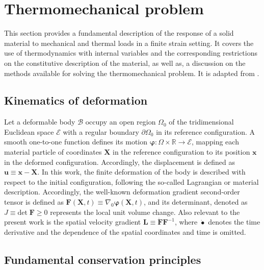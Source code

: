\chapter{Thermomechanical problem} \label{ch:thermomechanical_problem}

This section provides a fundamental description of the response of a solid material to mechanical and thermal loads in a finite strain setting.
It covers the use of thermodynamics with internal variables and the corresponding restrictions on the constitutive description of the material, as well as, a discussion on the methods available for solving the thermomechanical problem.
It is adapted from \cite{vila-chaNumericalAssessmentPartitioned2023a}.

\section{Kinematics of deformation}

Let a deformable body $\mathscr{B}$ occupy an open region $\Omega_0$ of the tridimensional Euclidean space $\mathscr{E}$ with a regular boundary $\partial \Omega_0$ in its reference configuration.
A smooth one-to-one function defines its motion \(\bm{\varphi}\colon \Omega\times \mathbb{R}\to \mathscr{E}\), mapping each material particle of coordinates $\bm{X}$ in the reference configuration to its position $\bm{x}$ in the deformed configuration.
Accordingly, the displacement is defined as \(\bm{u}\equiv \bm{x} - \bm{X}\).
In this work, the finite deformation of the body is described with respect to the initial configuration, following the so-called Lagrangian or material description.
Accordingly, the well-known deformation gradient second-order tensor is defined as \(\bm{F}(\bm{X},t)\equiv \nabla_0\bm\varphi(\bm{X},t)\), and its determinant, denoted as \(J\equiv \text{det}\;\bm{F} \geq 0\) represents the local unit volume change.
Also relevant to the present work is the spatial velocity gradient $\bm L\equiv \dot{\bm F}{\bm F}^{-1}$, where $\dot\bullet$ denotes the time derivative and the dependence of the spatial coordinates and time is omitted.

\section{Fundamental conservation principles} \label{sec:fundamental_conservation_princ}

